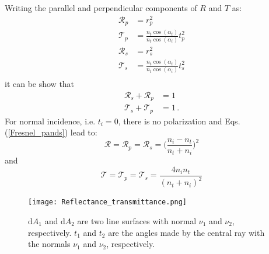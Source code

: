 Writing the parallel and perpendicular components of $R$ and $T$ as:
\begin{equation}\label{Fresnel_pands}
\begin{split}
\mathcal{R}_p& =  {r_p^2}\\
\mathcal{T}_p &=  \frac{n_t \cos(\alpha_t)}{n_t \cos(\alpha_i)}t_p^2\\
\mathcal{R}_s &=  r_s^2\\
\mathcal{T}_s &= \frac{n_t \cos(\alpha_t)}{n_t \cos(\alpha_i)}t_s^2\\
\end{split}
\end{equation}
it can be show that
\begin{equation}
\begin{split}
\mathcal{R}_s+\mathcal{R}_p &= 1\\
\mathcal{T}_s+\mathcal{T}_p &=1\,.
\end{split}
\end{equation}
For normal incidence, i.e. $t_i = 0$, there is no polarization and Eqs. (\ref{Fresnel_pands}) lead to:
\begin{equation}
\mathcal{R} = \mathcal{R}_p = \mathcal{R}_s = \Bigg(\frac{n_i-n_t}{n_t+n_i}\Bigg)^2
\end{equation}
and 
\begin{equation}
\mathcal{T} = \mathcal{T}_p = \mathcal{T}_s = \frac{4n_i n_t}{(n_t+n_i)^2}
\end{equation}
\begin{figure}[h]
 \label{fig:Reflectance_transmittance}
     \begin{center}
     \texttt{[image: Reflectance\_transmittance.png]}
     \end{center}
     \caption{\footnotesize{$\textrm{d}A_1$ and $\textrm{d}A_2$ are two line surfaces with normal $\nu_1$ and $\nu_2$, respectively. $t_1$ and $t_2$ are the angles made by the central ray with the normals $\nu_1$ and $\nu_2$, respectively.}}
\label{fig:amplitude_coefficients}
 \end{figure}






























































